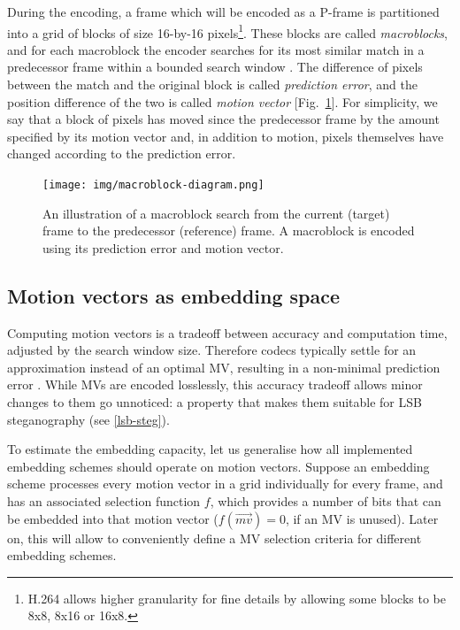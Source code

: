 \documentclass[12pt,british,twoside,notitlepage,usenames,dvipsnames,hypens,final]{report}
\numberwithin{equation}{section}
\numberwithin{figure}{section}
\begin{document}
During the encoding, a frame which will be encoded as a P-frame is partitioned into a grid of blocks of size 16-by-16 pixels\footnote{H.264 allows higher granularity for fine details by allowing some blocks to be 8x8, 8x16 or 16x8.}. These blocks are called \emph{macroblocks}, and for each macroblock the encoder searches for its most similar match in a predecessor frame within a bounded search window \cite[p.~256]{richardson2004h}. The difference of pixels between the match and the original block is called \emph{prediction error}, and the position difference of the two is called \emph{motion vector} [Fig.~\ref{fig:mb-search}]. For simplicity, we say that a block of pixels has moved since the predecessor frame by the amount specified by its motion vector and, in addition to motion, pixels themselves have changed according to the prediction error.

\begin{figure}[tbh]
\centerline{\texttt{[image: img/macroblock-diagram.png]}}
\caption{An illustration of a macroblock search from the current (target) frame to the predecessor (reference) frame. A macroblock is encoded using its prediction error and  motion vector.}
\label{fig:mb-search}
\end{figure} 

\subsection{Motion vectors as embedding space}

Computing motion vectors is a tradeoff between accuracy and computation time, adjusted by the search window size. Therefore codecs typically settle for an approximation instead of an optimal MV, resulting in a non-minimal prediction error \cite[p.~257]{richardson2004h}. While MVs are encoded losslessly, this accuracy tradeoff allows minor changes to them go unnoticed: a property that makes them suitable for LSB steganography (see \ref{lsb-steg}).

To estimate the embedding capacity, let us generalise how all implemented embedding schemes should operate on motion vectors. Suppose an embedding scheme processes every motion vector in a grid individually for every frame, and has an associated selection function $f$, which provides a number of bits that can be embedded into that motion vector ($f(\overrightarrow{mv}) = 0$, if an MV is unused). Later on, this will allow to conveniently define a MV selection criteria for different embedding schemes.
\end{document}

